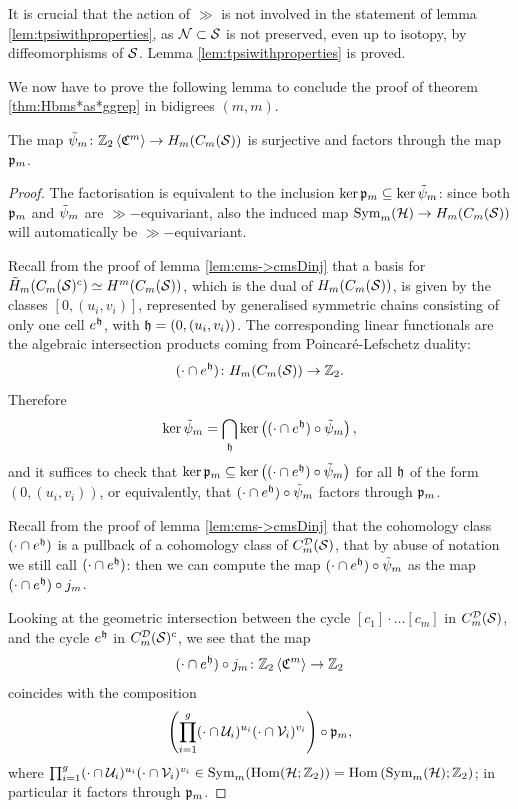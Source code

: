 It is crucial that the action of $\gg$ is not involved in the statement of lemma
\ref{lem:tpsiwithproperties}, as $\N\subset\S$ is not preserved, even up to isotopy,
by diffeomorphisms of $\S$.
Lemma \ref{lem:tpsiwithproperties} is proved.

We now have to prove the following lemma to conclude the proof of theorem \ref{thm:Hbms*as*ggrep}
in bidigrees $(m,m)$.
\begin{lem}
 \label{lem:tpsi->psi}
The map $\tpsi_m\colon\ZcC{m}\to H_m(\cms)$ is surjective and factors through the map $\pr_m$.
\end{lem}
\begin{proof}
The factorisation is equivalent to the inclusion $\ker\pr_m\subseteq\ker\tpsi_m$: since both
$\pr_m$ and $\tpsi_m$
are $\gg-$equivariant, also the induced map $\Sym_m(\H)\to H_m(\cms)$ will automatically be
$\gg-$equivariant.

Recall from the proof of lemma \ref{lem:cms->cmsDinj} that a basis for $\tH_m(\cms^c)\simeq H^m(\cms)$, which is
the dual of $H_m(\cms)$, is given by the classes $[0,(u_i,v_i)]$, represented by generalised
symmetric chains consisting of only one cell $e^{\tup}$, with $\tup=(0,(u_i,v_i))$.
The corresponding linear functionals are the algebraic intersection products
coming from Poincaré-Lefschetz duality:
\[
 (\cdot\cap e^{\tup})\colon H_m(\cms)\to\Z_2.
\]
Therefore
\[
 \ker\tpsi_m=\bigcap_{\tup}\ker\pa{(\cdot\cap e^{\tup})\circ\tpsi_m},
\]
and it suffices to check that $\ker\pr_m\subseteq\ker\pa{(\cdot\cap e^{\tup})\circ\tpsi_m}$
for all $\tup$ of the form $(0,(u_i,v_i))$, or equivalently, that $(\cdot\cap e^{\tup})\circ\tpsi_m$ factors through $\pr_m$.

Recall from the proof of lemma \ref{lem:cms->cmsDinj} that the cohomology class $(\cdot\cap e^{\tup})$ is a pullback
of a cohomology class of $\cmsD$, that by abuse of notation we still call $(\cdot\cap e^{\tup})$:
then we can compute the map $(\cdot\cap e^{\tup})\circ\tpsi_m$ as the map $(\cdot\cap e^{\tup})\circ\j_m$.

Looking at the geometric intersection between the cycle $[c_1]\cdot\dots[c_m]$ in
$\cmsD$, and the cycle $e^{\tup}$ in $\cmsD^c$, we see that the map
\[
(\cdot\cap e^{\tup})\circ\j_m\colon \ZcC{m}\to\Z_2
\]
coincides with the composition
\[
\pa{ \prod_{i=1}^g(\cdot\cap\U_i)^{u_i}(\cdot\cap\V_i)^{v_i}}\circ\pr_m,
\]
where $\prod_{i=1}^g(\cdot\cap\U_i)^{u_i}(\cdot\cap\V_i)^{v_i}\in\Sym_m(\Hom(\H;\Z_2))=\Hom\pa{\Sym_m(\H);\Z_2}$;
in particular it factors through $\pr_m$.


\end{proof}
